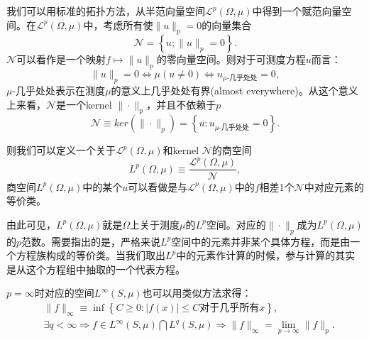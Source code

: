 我们可以用标准的拓扑方法，从半范向量空间$\mathcal{L}^p(\Omega,\mu)$中得到一个赋范向量空间。在$\mathcal{L}^p(\Omega,\mu)$中，考虑所有使$\| u \|_p = 0$的向量集合
\begin{equation*}
  \mathcal{N} = \left\{ u;  \| u \|_p = 0 \right\}.
\end{equation*}
$\mathcal{N}$可以看作是一个映射$f \mapsto \| u \|_p$的零向量空间。则对于可测度方程$u$而言：
\begin{equation*}
  \| u \|_p = 0 \Longleftrightarrow \mu(u \neq 0) \Longleftrightarrow u_{\mu\text{-几乎处处}} = 0,
\end{equation*}
$\mu\text{-几乎处处}$表示在测度$\mu$的意义上几乎处处有界(almost everywhere)。从这个意义上来看，$\mathcal{N}$是一个kernel $\| \cdot \|_p$，并且不依赖于$p$
\begin{equation*}
  \mathcal{N} \equiv ker\left( \| \cdot \|_p \right) = \left\{ u: u _{\mu\text{-几乎处处}}=0 \right\}.
\end{equation*}

则我们可以定义一个关于$\mathcal{L}^p(\Omega,\mu)$和kernel $\mathcal{N}$的商空间
\begin{equation*}
  L^p(\Omega,\mu) \equiv \frac{\mathcal{L}^p (\Omega,\mu)}{\mathcal{N}},
\end{equation*}
商空间$L^p(\Omega,\mu)$中的某个$u$可以看做是与$\mathcal{L}^p(\Omega,\mu)$中的$f$相差1个$\mathcal{N}$中对应元素的等价类。

由此可见，$L^p(\Omega,\mu)$就是$\Omega$上关于测度$\mu$的$L^p$空间。对应的$\| \cdot \|_p$成为$L^p(\Omega,\mu)$的$p$范数。需要指出的是，严格来说$L^p$空间中的元素并非某个具体方程，而是由一个方程族构成的等价类。当我们取出$L^p$中的元素作计算的时候，参与计算的其实是从这个方程组中抽取的一个代表方程。

$p = \infty$时对应的空间$L^{\infty}(S,\mu)$也可以用类似方法求得：
\begin{equation*}
  \begin{split}
    &\| f \|_{\infty} \equiv \inf \left\{ C \ge 0: \left| f(x) \right| \le C \text{对于几乎所有}x \right\},\\
    &\exists q < \infty \Rightarrow f \in L^{\infty}(S,\mu) \bigcap L^{q}(S,\mu) \Rightarrow \| f \|_{\infty} = \lim_{p \rightarrow \infty} \| f \|_{p}.
  \end{split}
\end{equation*}


